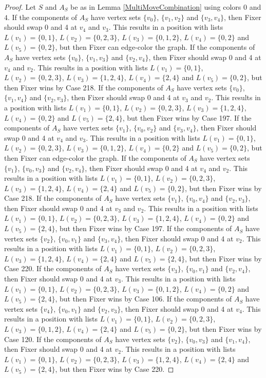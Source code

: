 \documentclass[12pt]{amsart}
\theoremstyle{plain}
\theoremstyle{definition}
\theoremstyle{remark}
\begin{document}
\begin{proof}
Let $S$ and $A_S$ be as in Lemma \ref{MultiMoveCombination} using colors $0$ and $4$. If the components of $A_S$ have vertex sets $\{v_0\}$, $\{v_1, v_2\}$ and $\{v_3, v_4\}$, then Fixer should swap 0 and 4 at $v_4$ and $v_3$. This results in a position with lists $L(v_1) = \{0, 1\}$, $L(v_2) = \{0, 2, 3\}$, $L(v_3) = \{0, 1, 2\}$, $L(v_4) = \{0, 2\}$ and $L(v_5) = \{0, 2\}$, but then Fixer can edge-color the graph. If the components of $A_S$ have vertex sets $\{v_0\}$, $\{v_1, v_3\}$ and $\{v_2, v_4\}$, then Fixer should swap 0 and 4 at $v_4$ and $v_2$. This results in a position with lists $L(v_1) = \{0, 1\}$, $L(v_2) = \{0, 2, 3\}$, $L(v_3) = \{1, 2, 4\}$, $L(v_4) = \{2, 4\}$ and $L(v_5) = \{0, 2\}$, but then Fixer wins by Case 218. If the components of $A_S$ have vertex sets $\{v_0\}$, $\{v_1, v_4\}$ and $\{v_2, v_3\}$, then Fixer should swap 0 and 4 at $v_3$ and $v_2$. This results in a position with lists $L(v_1) = \{0, 1\}$, $L(v_2) = \{0, 2, 3\}$, $L(v_3) = \{1, 2, 4\}$, $L(v_4) = \{0, 2\}$ and $L(v_5) = \{2, 4\}$, but then Fixer wins by Case 197. If the components of $A_S$ have vertex sets $\{v_1\}$, $\{v_0, v_2\}$ and $\{v_3, v_4\}$, then Fixer should swap 0 and 4 at $v_4$ and $v_3$. This results in a position with lists $L(v_1) = \{0, 1\}$, $L(v_2) = \{0, 2, 3\}$, $L(v_3) = \{0, 1, 2\}$, $L(v_4) = \{0, 2\}$ and $L(v_5) = \{0, 2\}$, but then Fixer can edge-color the graph. If the components of $A_S$ have vertex sets $\{v_1\}$, $\{v_0, v_3\}$ and $\{v_2, v_4\}$, then Fixer should swap 0 and 4 at $v_4$ and $v_2$. This results in a position with lists $L(v_1) = \{0, 1\}$, $L(v_2) = \{0, 2, 3\}$, $L(v_3) = \{1, 2, 4\}$, $L(v_4) = \{2, 4\}$ and $L(v_5) = \{0, 2\}$, but then Fixer wins by Case 218. If the components of $A_S$ have vertex sets $\{v_1\}$, $\{v_0, v_4\}$ and $\{v_2, v_3\}$, then Fixer should swap 0 and 4 at $v_3$ and $v_2$. This results in a position with lists $L(v_1) = \{0, 1\}$, $L(v_2) = \{0, 2, 3\}$, $L(v_3) = \{1, 2, 4\}$, $L(v_4) = \{0, 2\}$ and $L(v_5) = \{2, 4\}$, but then Fixer wins by Case 197. If the components of $A_S$ have vertex sets $\{v_2\}$, $\{v_0, v_1\}$ and $\{v_3, v_4\}$, then Fixer should swap 0 and 4 at $v_2$. This results in a position with lists $L(v_1) = \{0, 1\}$, $L(v_2) = \{0, 2, 3\}$, $L(v_3) = \{1, 2, 4\}$, $L(v_4) = \{2, 4\}$ and $L(v_5) = \{2, 4\}$, but then Fixer wins by Case 220. If the components of $A_S$ have vertex sets $\{v_3\}$, $\{v_0, v_1\}$ and $\{v_2, v_4\}$, then Fixer should swap 0 and 4 at $v_3$. This results in a position with lists $L(v_1) = \{0, 1\}$, $L(v_2) = \{0, 2, 3\}$, $L(v_3) = \{0, 1, 2\}$, $L(v_4) = \{0, 2\}$ and $L(v_5) = \{2, 4\}$, but then Fixer wins by Case 106. If the components of $A_S$ have vertex sets $\{v_4\}$, $\{v_0, v_1\}$ and $\{v_2, v_3\}$, then Fixer should swap 0 and 4 at $v_4$. This results in a position with lists $L(v_1) = \{0, 1\}$, $L(v_2) = \{0, 2, 3\}$, $L(v_3) = \{0, 1, 2\}$, $L(v_4) = \{2, 4\}$ and $L(v_5) = \{0, 2\}$, but then Fixer wins by Case 120. If the components of $A_S$ have vertex sets $\{v_2\}$, $\{v_0, v_3\}$ and $\{v_1, v_4\}$, then Fixer should swap 0 and 4 at $v_2$. This results in a position with lists $L(v_1) = \{0, 1\}$, $L(v_2) = \{0, 2, 3\}$, $L(v_3) = \{1, 2, 4\}$, $L(v_4) = \{2, 4\}$ and $L(v_5) = \{2, 4\}$, but then Fixer wins by Case 220. 
\end{proof}
\end{document}
